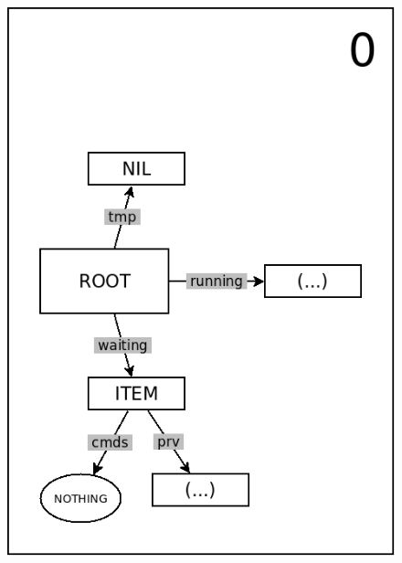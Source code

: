 \documentclass{acm_proc_article-sp}
\begin{document}
\begin{figure}%
\begin{minipage}[t]{0.24\linewidth}
\centering
\includegraphics[scale=0.25]{queue-20.png}
\end{minipage}
\begin{minipage}[t]{0.24\linewidth}
\centering

\end{minipage}
\end{figure}
\end{document}
